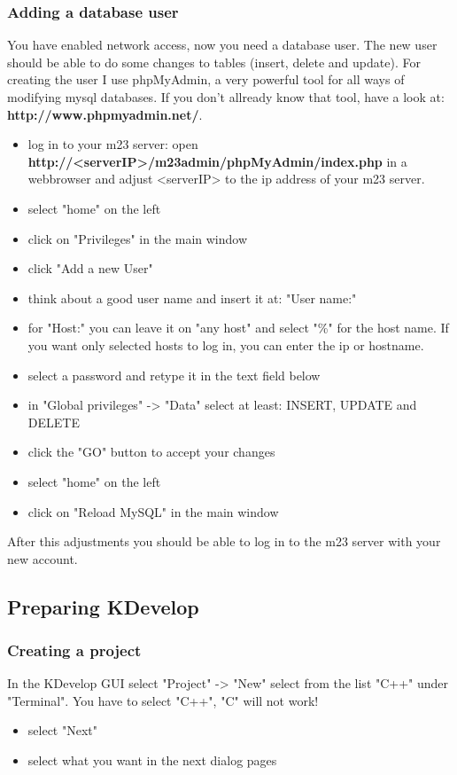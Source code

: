 \subsubsection{Adding a database user}
You have enabled network access, now you need a database user. The new user should be able to do some changes to tables (insert, delete and update). For creating the user I use phpMyAdmin, a very powerful tool for all ways of modifying mysql databases. If you don't allready know that tool, have a look at: \textbf{http://www.phpmyadmin.net/}.
\begin{itemize}
\item log in to your m23 server: open \textbf{http://<serverIP>/m23admin/phpMyAdmin/index.php} in a webbrowser and adjust <serverIP>  to the ip address of your m23 server.
\item select "home" on the left
\item click on "Privileges" in the main window
\item click "Add a new User"
\item think about a good user name and insert it at: "User name:"
\item for "Host:" you can leave it on "any host" and select "\%" for the host name. If you want only selected hosts to log in, you can enter the ip or hostname.
\item select a password and retype it in the text field below
\item in "Global privileges" -> "Data" select at least: INSERT, UPDATE and DELETE
\item click the "GO" button to accept your changes
\item select "home" on the left
\item click on "Reload MySQL" in the main window
\end{itemize}
After this adjustments you should be able to log in to the m23 server with your new account.

\subsection{Preparing KDevelop}
\subsubsection{Creating a project}
In the KDevelop GUI select "Project" -> "New" select from the list "C++" under "Terminal". You have to select "C++", "C" will not work!
\begin{itemize}
\item select "Next"
\item select what you want in the next dialog pages
\end{itemize}

